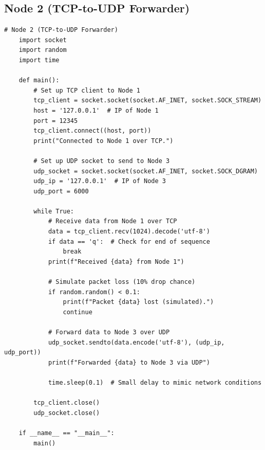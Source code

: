 \documentclass{article}
\begin{document}
\subsection{Node 2 (TCP-to-UDP Forwarder)}
\begin{lstlisting}[style=python]
    # Node 2 (TCP-to-UDP Forwarder)
    import socket
    import random
    import time
    
    def main():
        # Set up TCP client to Node 1
        tcp_client = socket.socket(socket.AF_INET, socket.SOCK_STREAM)
        host = '127.0.0.1'  # IP of Node 1
        port = 12345
        tcp_client.connect((host, port))
        print("Connected to Node 1 over TCP.")
    
        # Set up UDP socket to send to Node 3
        udp_socket = socket.socket(socket.AF_INET, socket.SOCK_DGRAM)
        udp_ip = '127.0.0.1'  # IP of Node 3
        udp_port = 6000
    
        while True:
            # Receive data from Node 1 over TCP
            data = tcp_client.recv(1024).decode('utf-8')
            if data == 'q':  # Check for end of sequence
                break
            print(f"Received {data} from Node 1")
    
            # Simulate packet loss (10% drop chance)
            if random.random() < 0.1:
                print(f"Packet {data} lost (simulated).")
                continue
    
            # Forward data to Node 3 over UDP
            udp_socket.sendto(data.encode('utf-8'), (udp_ip, udp_port))
            print(f"Forwarded {data} to Node 3 via UDP")
    
            time.sleep(0.1)  # Small delay to mimic network conditions
    
        tcp_client.close()
        udp_socket.close()
    
    if __name__ == "__main__":
        main()


\end{lstlisting}
\end{document}
